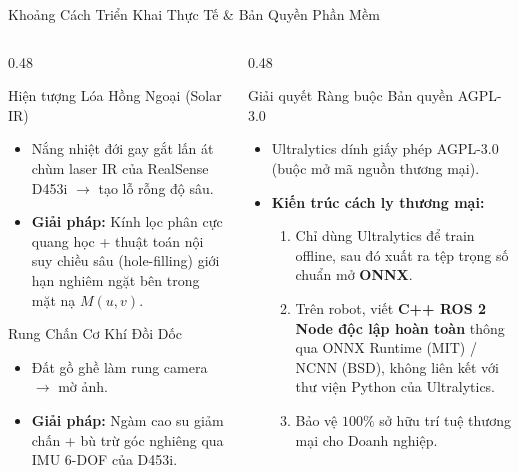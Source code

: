 \documentclass[aspectratio=169, 10pt]{beamer}
\begin{document}
\begin{frame}{Khoảng Cách Triển Khai Thực Tế \& Bản Quyền Phần Mềm}
\begin{columns}[T]
\begin{column}{0.48\textwidth}
    \begin{block}{Hiện tượng Lóa Hồng Ngoại (Solar IR)}
    \scriptsize
    \begin{itemize}
        \item Nắng nhiệt đới gay gắt lấn át chùm laser IR của RealSense D453i $\rightarrow$ tạo lỗ rỗng độ sâu.
        \item \textbf{Giải pháp:} Kính lọc phân cực quang học + thuật toán nội suy chiều sâu (hole-filling) giới hạn nghiêm ngặt bên trong mặt nạ $M(u, v)$.
    \end{itemize}
    \end{block}
    \begin{block}{Rung Chấn Cơ Khí Đồi Dốc}
    \scriptsize
    \begin{itemize}
        \item Đất gồ ghề làm rung camera $\rightarrow$ mờ ảnh.
        \item \textbf{Giải pháp:} Ngàm cao su giảm chấn + bù trừ góc nghiêng qua IMU 6-DOF của D453i.
    \end{itemize}
    \end{block}
\end{column}
\begin{column}{0.48\textwidth}
    \begin{alertblock}{Giải quyết Ràng buộc Bản quyền AGPL-3.0}
    \scriptsize
    \begin{itemize}
        \item Ultralytics dính giấy phép AGPL-3.0 (buộc mở mã nguồn thương mại).
        \item \textbf{Kiến trúc cách ly thương mại:}
        \begin{enumerate}
            \scriptsize
            \item Chỉ dùng Ultralytics để train offline, sau đó xuất ra tệp trọng số chuẩn mở \textbf{ONNX}.
            \item Trên robot, viết \textbf{C++ ROS 2 Node độc lập hoàn toàn} thông qua ONNX Runtime (MIT) / NCNN (BSD), không liên kết với thư viện Python của Ultralytics.
            \item Bảo vệ $100\%$ sở hữu trí tuệ thương mại cho Doanh nghiệp.
        \end{enumerate}
    \end{itemize}
    \end{alertblock}
\end{column}
\end{columns}
\end{frame}
\end{document}
